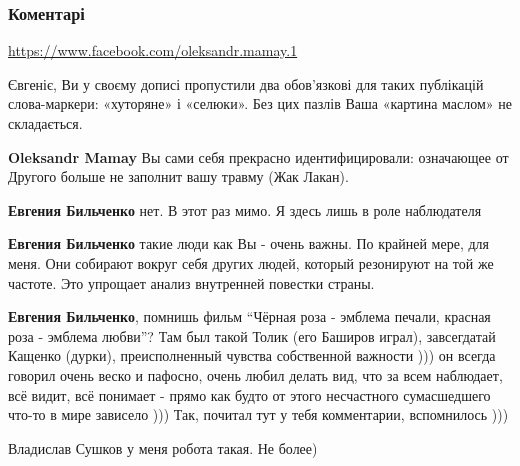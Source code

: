  
 
 
 
 
\subsubsection{Коментарі}

\begin{itemize}

\url{https://www.facebook.com/oleksandr.mamay.1}

\begin{itemize}

Євгеніє, Ви у своєму дописі пропустили два обов’язкові для таких публікацій
слова-маркери: «хуторяне» і «селюки». Без цих пазлів Ваша «картина маслом» не
складається.


\textbf{Oleksandr Mamay} Вы сами себя прекрасно идентифицировали: означающее от Другого больше не заполнит вашу травму (Жак Лакан).

\textbf{Евгения Бильченко} нет. В этот раз мимо. Я здесь лишь в роле наблюдателя

\textbf{Евгения Бильченко} такие люди как Вы - очень важны. По крайней мере,
для меня. Они собирают вокруг себя других людей, который резонируют на той же
частоте. Это упрощает анализ внутренней повестки страны.


\textbf{Евгения Бильченко}, помнишь фильм \enquote{Чёрная роза - эмблема печали,
красная роза - эмблема любви}? Там был такой Толик (его Баширов играл),
завсегдатай Кащенко (дурки), преисполненный чувства собственной важности ))) он
всегда говорил очень веско и пафосно, очень любил делать вид, что за всем
наблюдает, всё видит, всё понимает - прямо как будто от этого несчастного
сумасшедшего что-то в мире зависело ))) Так, почитал тут у тебя комментарии,
вспомнилось )))

Владислав Сушков у меня робота такая. Не более)


\end{itemize}
\end{itemize}
